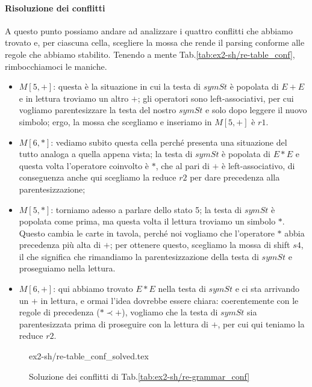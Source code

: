 \documentclass[class=book, crop=false, oneside, 12pt]{standalone}
\begin{document}
\paragraph{Risoluzione dei conflitti}
A questo punto possiamo andare ad analizzare i quattro conflitti che abbiamo trovato e, per ciascuna cella, scegliere la mossa che rende il parsing conforme alle regole che abbiamo stabilito. Tenendo a mente Tab.\ref{tab:ex2-sh/re-table_conf}, rimbocchiamoci le maniche.
\begin{itemize}
    \item \(M[5, +]\): questa è la situazione in cui la testa di \(symSt\) è popolata di \(E + E\) e in lettura troviamo un altro \(+\); gli operatori sono left-associativi, per cui vogliamo parentesizzare la testa del nostro \(symSt\) e solo dopo leggere il nuovo simbolo; ergo, la mossa che scegliamo e inseriamo in \(M[5, +]\) è \(r1\).
    \item \(M[6, *]\): vediamo subito questa cella perché presenta una situazione del tutto analoga a quella appena vista;  la testa di \(symSt\) è popolata di \(E * E\) e questa volta l'operatore coinvolto è \(\ast\), che al pari di \(+\) è left-associativo, di conseguenza anche qui scegliamo la reduce \(r2\) per dare precedenza alla parentesizzazione;
    \item \(M[5, *]\): torniamo adesso a parlare dello stato 5; la testa di \(symSt\) è popolata come prima, ma questa volta il lettura troviamo un simbolo \(\ast\). Questo cambia le carte in tavola, perché noi vogliamo che l'operatore \(\ast\) abbia precedenza più alta di \(+\); per ottenere questo, scegliamo la mossa di shift \(s4\), il che significa che rimandiamo la parentesizzazione della testa di \(symSt\) e proseguiamo nella lettura.
    \item \(M[6, +]\): qui abbiamo trovato \(E * E\) nella testa di \(symSt\) e ci sta arrivando un \(+\) in lettura, e ormai l'idea dovrebbe essere chiara: coerentemente con le regole di precedenza (\(\ast \prec +\)), vogliamo che la testa di \(symSt\) sia parentesizzata prima di proseguire con la lettura di \(+\), per cui qui teniamo la reduce \(r2\).
\end{itemize}
\begin{figure}[H]
    \centering
    {ex2-sh/re-table_conf_solved.tex}
    \caption{Soluzione dei conflitti di Tab.\ref{tab:ex2-sh/re-grammar_conf}}
    \label{tab:ex2-sh/re-table_conf_solved}
\end{figure}
\end{document}

